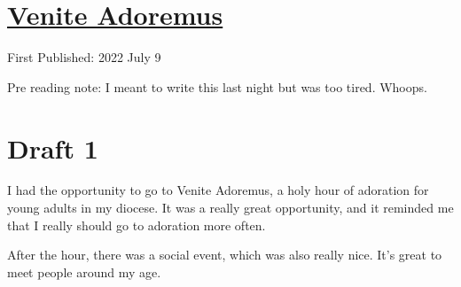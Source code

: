 \documentclass[12pt]{article}[titlepage]
\newcommand{\1}{\={a}}
\newcommand{\2}{\={e}}
\newcommand{\3}{\={\i}}
\newcommand{\4}{\=o}
\newcommand{\5}{\=u}
\newcommand{\6}{\={A}}
\renewcommand{\,}{\textsuperscript{,}}
\begin{document}
\doublespacing
\section{\href{venite.tex}{Venite Adoremus}}
First Published: 2022 July 9

Pre reading note: I meant to write this last night but was too tired. Whoops.
\section{Draft 1}
I had the opportunity to go to Venite Adoremus, a holy hour of adoration for young adults in my diocese.
It was a really great opportunity, and it reminded me that I really should go to adoration more often.

After the hour, there was a social event, which was also really nice.
It's great to meet people around my age.
\end{document}

